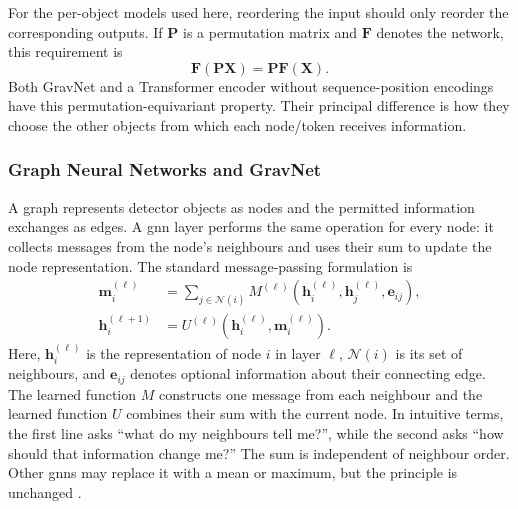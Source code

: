 For the per-object models used here, reordering the input should only reorder
the corresponding outputs. If \(\mathbf{P}\) is a permutation matrix and
\(\mathbf{F}\) denotes the network, this requirement is
\begin{equation}
    \mathbf{F}(\mathbf{P}\mathbf{X})
    =
    \mathbf{P}\mathbf{F}(\mathbf{X}).
\end{equation}
Both GravNet and a Transformer encoder without sequence-position encodings
have this permutation-equivariant property. Their principal difference is
how they choose the other objects from which each node/token receives
information.







\subsubsection{Graph Neural Networks and GravNet}
\label{sec:gnn_gravnet_background}

A graph represents detector objects as nodes and the permitted information
exchanges as edges. A \gls{gnn} layer performs the same operation for every node: it
collects messages from the node's neighbours and uses their sum to update the
node representation. The standard message-passing formulation is
\begin{align}
    \mathbf{m}_i^{(\ell)}
    &=
    \sum_{j\in\mathcal{N}(i)}
    M^{(\ell)}\!\left(
        \mathbf{h}_i^{(\ell)},
        \mathbf{h}_j^{(\ell)},
        \mathbf{e}_{ij}
    \right),
    \label{eq:generic_message}\\
    \mathbf{h}_i^{(\ell+1)}
    &=
    U^{(\ell)}\!\left(
        \mathbf{h}_i^{(\ell)},
        \mathbf{m}_i^{(\ell)}
    \right).
    \label{eq:generic_update}
\end{align}
Here, \(\mathbf{h}_i^{(\ell)}\) is the representation of node \(i\) in layer
\(\ell\), \(\mathcal{N}(i)\) is its set of neighbours, and
\(\mathbf{e}_{ij}\) denotes optional information about their connecting edge.
The learned function \(M\) constructs one message from each neighbour and the
learned function \(U\) combines their sum with the current node. In intuitive
terms, the first line asks ``what do my neighbours tell me?'', while the second
asks ``how should that information change me?'' The sum is independent of
neighbour order. Other \gls{gnn}s may replace it with a mean or maximum, but the
principle is unchanged \cite{gilmer2017-message-passing,duarte2020-gnn-tracking}.

